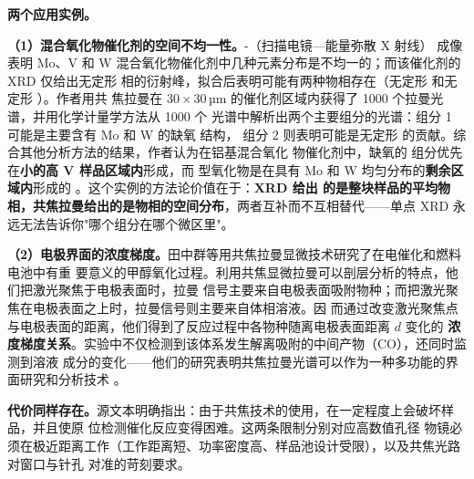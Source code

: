 \textbf{两个应用实例。}

\textbf{（1）混合氧化物催化剂的空间不均一性。}-（扫描电镜—能量弥散 X 射线）
成像表明 Mo、V 和 W 混合氧化物催化剂中几种元素分布是不均一的；而该催化剂的 XRD 仅给出无定形
相的衍射峰，拟合后表明可能有两种物相存在（无定形  和无定形 ）。作者用共
焦拉曼在 $30\times30\,$µm 的催化剂区域内获得了 1000 个拉曼光谱，并用化学计量学方法从 1000 个
光谱中解析出两个主要组分的光谱：组分 1 可能是主要含有 Mo 和 W 的缺氧  结构，
组分 2 则表明可能是无定形  的贡献。综合其他分析方法的结果，作者认为在铝基混合氧化
物催化剂中，缺氧的  组分优先在\textbf{小的高 V 样品区域内}形成，而
 型氧化物是在具有 Mo 和 W 均匀分布的\textbf{剩余区域内}形成的
。这个实例的方法论价值在于：\textbf{XRD 给出
的是整块样品的平均物相，共焦拉曼给出的是物相的空间分布}，两者互补而不互相替代——单点 XRD 永
远无法告诉你"哪个组分在哪个微区里"。

\textbf{（2）电极界面的浓度梯度。}田中群等用共焦拉曼显微技术研究了在电催化和燃料电池中有重
要意义的甲醇氧化过程。利用共焦显微拉曼可以剖层分析的特点，他们把激光聚焦于电极表面时，拉曼
信号主要来自电极表面吸附物种；而把激光聚焦在电极表面之上时，拉曼信号则主要来自体相溶液。因
而通过改变激光聚焦点与电极表面的距离，他们得到了反应过程中各物种随离电极表面距离 $d$ 变化的
\textbf{浓度梯度关系}。实验中不仅检测到该体系发生解离吸附的中间产物（CO），还同时监测到溶液
成分的变化——他们的研究表明共焦拉曼光谱可以作为一种多功能的界面研究和分析技术
。

\textbf{代价同样存在。}源文本明确指出：由于共焦技术的使用，在一定程度上会破坏样品，并且使原
位检测催化反应变得困难。这两条限制分别对应高数值孔径
物镜必须在极近距离工作（工作距离短、功率密度高、样品池设计受限），以及共焦光路对窗口与针孔
对准的苛刻要求。

